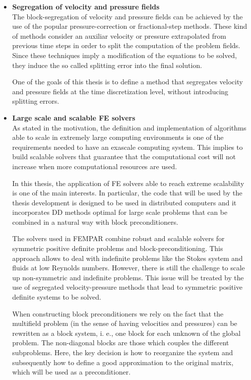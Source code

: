 \begin{itemize}
\item {\bf Segregation of velocity and pressure fields}\\
The block-segregation of velocity and pressure fields can be achieved by the use of the popular pressure-correction or fractional-step methods. These kind of methods consider an auxiliar velocity or pressure extrapolated from previous time steps in order to split the computation of the problem fields. Since these techniques imply a modification of the equations to be solved, they induce the so called splitting error into the final solution.

One of the goals of this thesis is to define a method that segregates velocity and pressure fields at the time discretization level, without introducing splitting errors.

\item {\bf Large scale and scalable FE solvers}\\
As stated in the motivation, the definition and implementation of algorithms able to scale in extremely large computing environments is one of the requirements needed to have an exascale computing system. This implies to build scalable solvers that guarantee that the computational cost will not increase when more computational resources are used.

In this thesis, the application of FE solvers able to reach extreme scalability is one of the main interests. In particular, the code that will be used by the thesis development is designed to be used in distributed computers and it incorporates DD methods optimal for large scale problems that can be combined in a natural way with block preconditioners.

The solvers used in FEMPAR combine robust and scalable solvers for symmetric positive definite problems and block-preconditioning. This approach allows to deal with indefinite problems like the Stokes system and fluids at low Reynolds numbers. However, there is still the challenge to scale up non-symmetric and indefinite problems. This issue will be treated by the use of segregated velocity-pressure methods that lead to symmetric positive definite systems to be solved.

When constructing block preconditioners we rely on the fact that the multifield problem (in the sense of having velocities and pressures) can be rewritten as a block system, i. e., one block for each unknown of the global problem. The non-diagonal blocks are those which couples the different subproblems. Here, the key decision is how to reorganize the system and subsequently how to define a good approximation to the original matrix, which will be used as a preconditioner.


\end{itemize}
